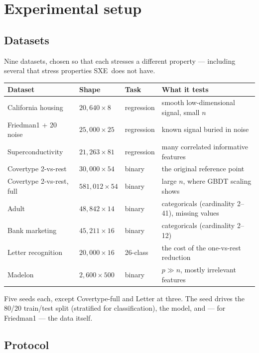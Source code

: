 \documentclass[11pt,a4paper]{article}
\newcommand{\SXE}{\textsc{SXE}}
\theoremstyle{definition}
\begin{document}
\section{Experimental setup}\label{sec:setup}

\subsection{Datasets}

Nine datasets, chosen so that each stresses a different property --- including
several that stress properties \SXE\ does not have.

\begin{center}
\small
\setlength{\tabcolsep}{4pt}
\begin{tabular}{llll}
\toprule
Dataset & Shape & Task & What it tests \\
\midrule
California housing & $20{,}640 \times 8$ & regression & smooth low-dimensional signal, small $n$ \\
Friedman1 + 20 noise & $25{,}000 \times 25$ & regression & known signal buried in noise \\
Superconductivity & $21{,}263 \times 81$ & regression & many correlated informative features \\
Covertype 2-vs-rest & $30{,}000 \times 54$ & binary & the original reference point \\
Covertype 2-vs-rest, full & $581{,}012 \times 54$ & binary & large $n$, where GBDT scaling shows \\
Adult & $48{,}842 \times 14$ & binary & categoricals (cardinality 2--41), missing values \\
Bank marketing & $45{,}211 \times 16$ & binary & categoricals (cardinality 2--12) \\
Letter recognition & $20{,}000 \times 16$ & 26-class & the cost of the one-vs-rest reduction \\
Madelon & $2{,}600 \times 500$ & binary & $p \gg n$, mostly irrelevant features \\
\bottomrule
\end{tabular}
\end{center}

Five seeds each, except Covertype-full and Letter at three. The seed drives the
80/20 train/test split (stratified for classification), the model, and --- for
Friedman1 --- the data itself.

\subsection{Protocol}
\end{document}
